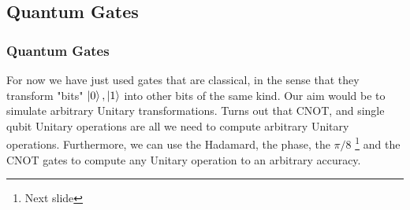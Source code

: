 \documentclass{beamer}
\begin{document}
        \subsection{Quantum Gates}
        \begin{frame}
            \frametitle{Quantum Gates}
            For now we have just used gates that are classical, in the sense that they transform "bits"
            $\ket{0}, \ket{1}$ into other bits of the same kind. Our aim would be to simulate arbitrary
            Unitary transformations. Turns out that CNOT, and single qubit Unitary operations are all we need
            to compute arbitrary Unitary operations. Furthermore, we can use the Hadamard,
            the phase, the $\pi/8$ \footnote{Next slide} and the CNOT gates to compute any Unitary operation to an arbitrary accuracy. \\
        \end{frame}
\end{document}
